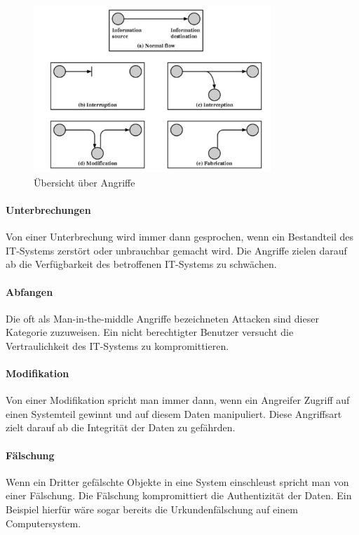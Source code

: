 \documentclass[utf8,biblatex]{lni}
\begin{document}
\begin{figure}
    \centering
    \includegraphics[width=0.8\textwidth]{images/angriffe_pic1.png}
    \caption[Beschreibung für Inhaltsverzeichnis]{Übersicht über Angriffe} 
    \label{Referenz}
\end{figure} 

\paragraph{Unterbrechungen}
Von einer Unterbrechung wird immer dann gesprochen, wenn ein Bestandteil des 
IT-Systems zerstört oder unbrauchbar gemacht wird. Die Angriffe zielen darauf 
ab die Verfügbarkeit des betroffenen IT-Systems zu schwächen. 

\paragraph{Abfangen}
Die oft als \glqq Man-in-the-middle\grqq{} Angriffe bezeichneten Attacken sind dieser 
Kategorie zuzuweisen. Ein nicht berechtigter Benutzer versucht die Vertraulichkeit des 
IT-Systems zu kompromittieren.  

\paragraph{Modifikation}
Von einer Modifikation spricht man immer dann, wenn ein Angreifer Zugriff auf einen 
Systemteil gewinnt und auf diesem Daten manipuliert. Diese Angriffsart zielt 
darauf ab die Integrität der Daten zu gefährden. 

\paragraph{Fälschung}
Wenn ein Dritter gefälschte Objekte in eine System einschleust spricht man von 
einer Fälschung. Die Fälschung kompromittiert die Authentizität der Daten. 
Ein Beispiel hierfür wäre sogar bereits die Urkundenfälschung auf einem Computersystem. 
\end{document}
